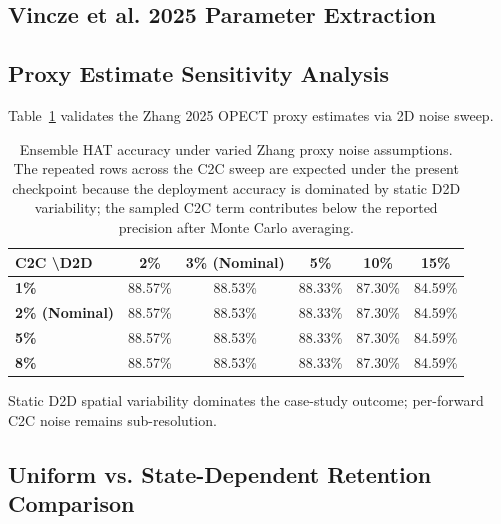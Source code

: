 \FloatBarrier

\subsection{Vincze et al. 2025 Parameter Extraction}
\label{deprecated-subsec:vincze-extraction}



\subsection{Proxy Estimate Sensitivity Analysis}
\label{deprecated-subsec:proxy-sensitivity}

Table~\ref{deprecated-tab:sensitivity} validates the Zhang 2025 OPECT proxy estimates via 2D noise sweep.

\begin{table}[ht]
\centering
\caption{Ensemble HAT accuracy under varied Zhang proxy noise assumptions. The repeated rows across the C2C sweep are expected under the present checkpoint because the deployment accuracy is dominated by static D2D variability; the sampled C2C term contributes below the reported precision after Monte Carlo averaging.}
\label{deprecated-tab:sensitivity}
\small
\begin{tabular}{lccccc}
\toprule
\textbf{C2C \textbackslash D2D} & \textbf{2\%} & \textbf{3\% (Nominal)} & \textbf{5\%} & \textbf{10\%} & \textbf{15\%} \\
\midrule
\textbf{1\%} & 88.57\% & 88.53\% & 88.33\% & 87.30\% & 84.59\% \\
\textbf{2\% (Nominal)} & 88.57\% & 88.53\% & 88.33\% & 87.30\% & 84.59\% \\
\textbf{5\%} & 88.57\% & 88.53\% & 88.33\% & 87.30\% & 84.59\% \\
\textbf{8\%} & 88.57\% & 88.53\% & 88.33\% & 87.30\% & 84.59\% \\
\bottomrule
\end{tabular}
\end{table}

Static D2D spatial variability dominates the case-study outcome; per-forward C2C noise remains sub-resolution.

\FloatBarrier

\subsection{Uniform vs. State-Dependent Retention Comparison}
\label{deprecated-subsec:retention-comparison}

